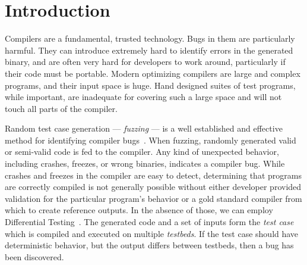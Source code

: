 \section{Introduction}\label{sec:intro}

\noindent
Compilers are a fundamental, trusted technology. Bugs in them are particularly harmful. They can introduce extremely hard to identify errors in the generated binary, and are often very hard for developers to work around, particularly if their code must be portable. Modern optimizing compilers are large and complex programs, and their input space is huge. Hand designed suites of test programs, while important, are inadequate for covering such a large space and will not touch all parts of the compiler.


Random test case generation --- \emph{fuzzing} --- is a well established and effective method for identifying compiler bugs~\cite{Chen2014a,Chen2013,Kossatchev2005}. When fuzzing, randomly generated valid or semi-valid code is fed to the compiler. Any kind of unexpected behavior, including crashes, freezes, or wrong binaries, indicates a compiler bug. While crashes and freezes in the compiler are easy to detect, determining that programs are correctly compiled is not generally possible without either developer provided validation for the particular program's behavior or a gold standard compiler from which to create reference outputs. In the absence of those, we can employ Differential Testing~\cite{McKeeman1998}. The generated code and a set of inputs form the \emph{test case} which is compiled and executed on multiple \emph{testbeds}. If the test case should have deterministic behavior, but the output differs between testbeds, then a bug has been discovered.

